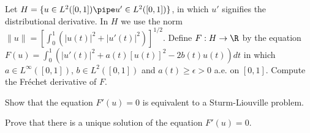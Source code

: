 \begin{alist}
\item Let $H=\{u\in L^2([0,1])\pipe u'\in L^2([0,1])\}$, in which $u'$
signifies the distributional derivative. In $H$ we use the norm
$\|u\|=[\int_0^1(|u(t)|^2+|u'(t)|^2)]^{1/2}$. Define $F:H\rightarrow
\R$ by the equation
$F(u)=\int_0^1(|u'(t)|^2+a(t)[u(t)]^2-2b(t)u(t))dt$ in which $a\in
L^{\infty}([0,1])$, $b\in L^2([0,1])$ and $a(t)\geq \epsilon>0$
a.e. on $[0,1]$. Compute the Fr\'echet derivative of $F$.
\item Show that the equation $F'(u)=0$ is equivalent to a
Sturm-Liouville problem.
\item Prove that there is a unique solution of the equation $F'(u)=0$.
\end{alist}
